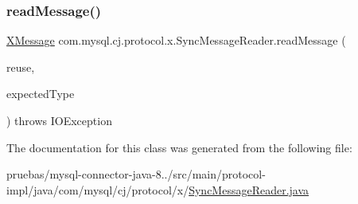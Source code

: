 \mbox{\label{classcom_1_1mysql_1_1cj_1_1protocol_1_1x_1_1_sync_message_reader_a878c3dcae955da43eb45bee60d904e54}} 
\subsubsection{\texorpdfstring{read\+Message()}{readMessage()}\hspace{0.1cm}{\footnotesize\ttfamily [2/2]}}
{\footnotesize\ttfamily \mbox{\hyperlink{classcom_1_1mysql_1_1cj_1_1protocol_1_1x_1_1_x_message}{X\+Message}} com.\+mysql.\+cj.\+protocol.\+x.\+Sync\+Message\+Reader.\+read\+Message (\begin{DoxyParamCaption}\item[{Optional$<$ \mbox{\hyperlink{classcom_1_1mysql_1_1cj_1_1protocol_1_1x_1_1_x_message}{X\+Message}} $>$}]{reuse,  }\item[{int}]{expected\+Type }\end{DoxyParamCaption}) throws I\+O\+Exception}



The documentation for this class was generated from the following file\+:\begin{DoxyCompactItemize}
\item 
pruebas/mysql-\/connector-\/java-\/8../src/main/protocol-\/impl/java/com/mysql/cj/protocol/x/\mbox{\hyperlink{_sync_message_reader_8java}{Sync\+Message\+Reader.\+java}}\end{DoxyCompactItemize}
